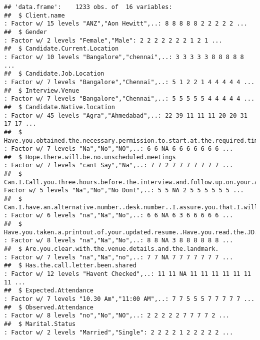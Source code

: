 \documentclass[]{article}
\begin{document}
\begin{verbatim}
## 'data.frame':    1233 obs. of  16 variables:
##  $ Client.name                                                                                       : Factor w/ 15 levels "ANZ","Aon Hewitt",..: 8 8 8 8 8 2 2 2 2 2 ...
##  $ Gender                                                                                            : Factor w/ 2 levels "Female","Male": 2 2 2 2 2 2 2 1 2 1 ...
##  $ Candidate.Current.Location                                                                        : Factor w/ 10 levels "Bangalore","chennai",..: 3 3 3 3 3 8 8 8 8 8 ...
##  $ Candidate.Job.Location                                                                            : Factor w/ 7 levels "Bangalore","Chennai",..: 5 1 2 2 1 4 4 4 4 4 ...
##  $ Interview.Venue                                                                                   : Factor w/ 7 levels "Bangalore","Chennai",..: 5 5 5 5 5 4 4 4 4 4 ...
##  $ Candidate.Native.location                                                                         : Factor w/ 45 levels "Agra","Ahmedabad",..: 22 39 11 11 11 20 20 31 17 17 ...
##  $ Have.you.obtained.the.necessary.permission.to.start.at.the.required.time                          : Factor w/ 7 levels "Na","No","NO",..: 6 6 NA 6 6 6 6 6 6 6 ...
##  $ Hope.there.will.be.no.unscheduled.meetings                                                        : Factor w/ 7 levels "cant Say","Na",..: 7 7 2 7 7 7 7 7 7 7 ...
##  $ Can.I.Call.you.three.hours.before.the.interview.and.follow.up.on.your.attendance.for.the.interview: Factor w/ 5 levels "Na","No","No Dont",..: 5 5 NA 2 5 5 5 5 5 5 ...
##  $ Can.I.have.an.alternative.number..desk.number..I.assure.you.that.I.will.not.trouble.you.too.much  : Factor w/ 6 levels "na","Na","No",..: 6 6 NA 6 3 6 6 6 6 6 ...
##  $ Have.you.taken.a.printout.of.your.updated.resume..Have.you.read.the.JD.and.understood.the.same    : Factor w/ 8 levels "na","Na","No",..: 8 8 NA 3 8 8 8 8 8 8 ...
##  $ Are.you.clear.with.the.venue.details.and.the.landmark.                                            : Factor w/ 7 levels "na","Na","no",..: 7 7 NA 7 7 7 7 7 7 7 ...
##  $ Has.the.call.letter.been.shared                                                                   : Factor w/ 12 levels "Havent Checked",..: 11 11 NA 11 11 11 11 11 11 11 ...
##  $ Expected.Attendance                                                                               : Factor w/ 7 levels "10.30 Am","11:00 AM",..: 7 7 5 5 5 7 7 7 7 7 ...
##  $ Observed.Attendance                                                                               : Factor w/ 8 levels "no","No","NO",..: 2 2 2 2 2 7 7 7 7 2 ...
##  $ Marital.Status                                                                                    : Factor w/ 2 levels "Married","Single": 2 2 2 2 1 2 2 2 2 2 ...
\end{verbatim}
\end{document}
